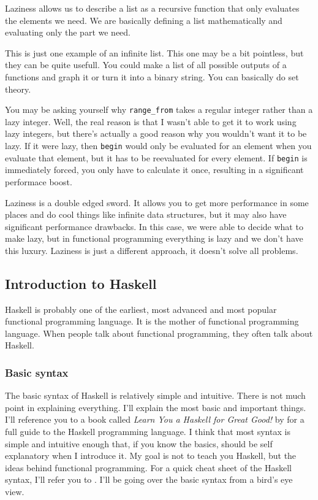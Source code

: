 \documentclass[11pt]{article}
\begin{document}
Laziness allows us to describe a list as a recursive function that only
evaluates the elements we need. We are basically defining a list mathematically
and evaluating only the part we need.

This is just one example of an infinite list. This one may be a bit pointless,
but they can be quite usefull. You could make a list of all possible outputs of
a functions and graph it or turn it into a binary string. You can basically do
set theory.


You may be asking yourself why \texttt{range\_from} takes a regular integer
rather than a lazy integer. Well, the real reason is that I wasn't able to get
it to work using lazy integers, but there's actually a good reason why you
wouldn't want it to be lazy. If it were lazy, then \texttt{begin} would only be
evaluated for an element when you evaluate that element, but it has to be
reevaluated for every element. If \texttt{begin} is immediately forced, you
only have to calculate it once, resulting in a significant performace boost.

Laziness is a double edged sword. It allows you to get more performance in some
places and do cool things like infinite data structures, but it may also have
significant performance drawbacks. In this case, we were able to decide what to
make lazy, but in functional programming everything is lazy and we don't have
this luxury. Laziness is just a different approach, it doesn't solve all
problems.


\subsection{Introduction to Haskell}

Haskell is probably one of the earliest, most advanced and most popular
functional programming language. It is the mother of functional programming
language. When people talk about functional programming, they often talk about
Haskell.

\subsubsection{Basic syntax}\label{syntax}

The basic syntax of Haskell is relatively simple and intuitive. There is not
much point in explaining everything. I'll explain the most basic and important
things. I'll reference you to a book called \emph{Learn You a Haskell for Great
Good!} by \textcite{miran2011} for a full guide to the Haskell programming
language. I think that most syntax is simple and intuitive enough that, if you
know the basics, should be self explanatory when I introduce it. My goal is not
to teach you Haskell, but the ideas behind functional programming. For a quick
cheat sheet of the Haskell syntax, I'll refer you to \parencite{haskell}. I'll
be going over the basic syntax from a bird's eye view.
\end{document}
